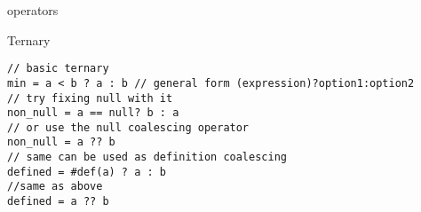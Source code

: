 \begin{section}{operators}
\begin{subsection}{Ternary}
\begin{center}\begin{minipage}{\linewidth}
\begin{lstlisting}[style=JexlStyle]
// basic ternary 
min = a < b ? a : b // general form (expression)?option1:option2 
// try fixing null with it
non_null = a == null? b : a
// or use the null coalescing operator   
non_null = a ?? b 
// same can be used as definition coalescing
defined = #def(a) ? a : b
//same as above 
defined = a ?? b
\end{lstlisting}
\end{minipage}
\end{center}
\end{subsection}


\end{section}


